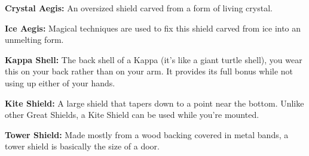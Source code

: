 \textbf{Crystal Aegis:} An oversized shield carved from a form of living crystal.

\textbf{Ice Aegis:} Magical techniques are used to fix this shield carved from ice into an unmelting form.

\textbf{Kappa Shell:} The back shell of a Kappa (it's like a giant turtle shell), you wear this on your back rather than on your arm. It provides its full bonus while not using up either of your hands.

\textbf{Kite Shield:} A large shield that tapers down to a point near the bottom. Unlike other Great Shields, a Kite Shield can be used while you're mounted.

\textbf{Tower Shield:} Made mostly from a wood backing covered in metal bands, a tower shield is basically the size of a door.
